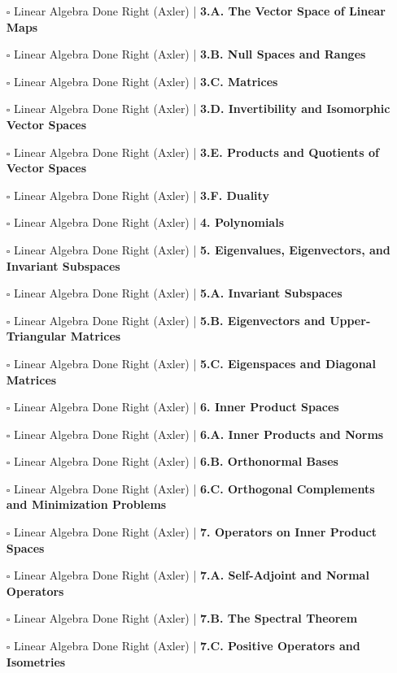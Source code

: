 \documentclass[a4, landscape, 12pt]{article}
\newcommand{\checkbox}{$\square$}%
\begin{document}
\begin{itemize}
{}
\item [\checkbox] Linear Algebra Done Right (Axler)  | \textbf{3.A. The Vector Space of Linear Maps
}
\item [\checkbox] Linear Algebra Done Right (Axler)  | \textbf{3.B. Null Spaces and Ranges
}
\item [\checkbox] Linear Algebra Done Right (Axler)  | \textbf{3.C. Matrices
}
\item [\checkbox] Linear Algebra Done Right (Axler)  | \textbf{3.D. Invertibility and Isomorphic Vector Spaces
}
\item [\checkbox] Linear Algebra Done Right (Axler)  | \textbf{3.E. Products and Quotients of Vector Spaces
}
\item [\checkbox] Linear Algebra Done Right (Axler)  | \textbf{3.F. Duality
}
\item [\checkbox] Linear Algebra Done Right (Axler)  | \textbf{4. Polynomials
}
\item [\checkbox] Linear Algebra Done Right (Axler)  | \textbf{5. Eigenvalues, Eigenvectors, and Invariant Subspaces
}
\item [\checkbox] Linear Algebra Done Right (Axler)  | \textbf{5.A. Invariant Subspaces
}
\item [\checkbox] Linear Algebra Done Right (Axler)  | \textbf{5.B. Eigenvectors and Upper-Triangular Matrices
}
\item [\checkbox] Linear Algebra Done Right (Axler)  | \textbf{5.C. Eigenspaces and Diagonal Matrices
}
\item [\checkbox] Linear Algebra Done Right (Axler)  | \textbf{6. Inner Product Spaces
}
\item [\checkbox] Linear Algebra Done Right (Axler)  | \textbf{6.A. Inner Products and Norms
}
\item [\checkbox] Linear Algebra Done Right (Axler)  | \textbf{6.B. Orthonormal Bases
}
\item [\checkbox] Linear Algebra Done Right (Axler)  | \textbf{6.C. Orthogonal Complements and Minimization Problems
}
\item [\checkbox] Linear Algebra Done Right (Axler)  | \textbf{7. Operators on Inner Product Spaces
}
\item [\checkbox] Linear Algebra Done Right (Axler)  | \textbf{7.A. Self-Adjoint and Normal Operators
}
\item [\checkbox] Linear Algebra Done Right (Axler)  | \textbf{7.B. The Spectral Theorem
}
\item [\checkbox] Linear Algebra Done Right (Axler)  | \textbf{7.C. Positive Operators and Isometries
}
\end{itemize}
\end{document}
